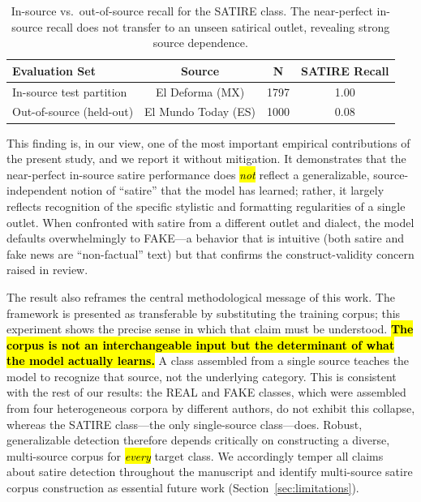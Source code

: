 \documentclass[informatics,article,accept,pdftex,moreauthors]{Definitions/mdpi}
\begin{document}
\begin{table}[H]
\centering
\caption{In-source vs.\ out-of-source recall for the SATIRE class. The near-perfect in-source recall does not transfer to an unseen satirical outlet, revealing strong source dependence.}
\label{tab:cross_source}
\begin{tabularx}{\textwidth}{lcCC}
\toprule
\textbf{Evaluation Set} & \textbf{Source} & \textbf{N} & \textbf{SATIRE Recall} \\
\midrule
In-source test partition  & El Deforma (MX)   & 1797 & 1.00 \\
Out-of-source (held-out)   & El Mundo Today (ES) & 1000 & 0.08 \\
\bottomrule
\end{tabularx}
\end{table}
\vspace{-3pt}
This finding is, in our view, one of the most important empirical contributions of the present study, and we report it without mitigation. It demonstrates that the near-perfect in-source satire performance does \emph{\hl{not}} reflect a generalizable, source-independent notion of ``satire'' that the model has learned; rather, it largely reflects recognition of the specific stylistic and formatting regularities of a single outlet. When confronted with satire from a different outlet and dialect, the model defaults overwhelmingly to FAKE—a behavior that is intuitive (both satire and fake news are ``non-factual'' text) but that confirms the construct-validity concern raised in review.

The result also reframes the central methodological message of this work. The framework is presented as transferable by substituting the training corpus; this experiment shows the precise sense in which that claim must be understood. \textbf{\hl{The corpus is not an interchangeable input but the determinant of what the model actually learns.}} A class assembled from a single source teaches the model to recognize that source, not the underlying category. This is consistent with the rest of our results: the REAL and FAKE classes, which were assembled from four heterogeneous corpora by different authors, do not exhibit this collapse, whereas the SATIRE class—the only single-source class—does. Robust, generalizable detection therefore depends critically on constructing a diverse, multi-source corpus for \emph{\hl{every}} target class. We accordingly temper all claims about satire detection throughout the manuscript and identify multi-source satire corpus construction as essential future work (Section~\ref{sec:limitations}).
\end{document}
